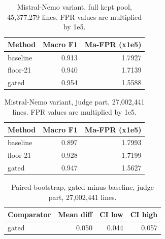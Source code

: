 \begin{table}[htbp]
\centering
\small
\begin{tabular}{lrr}
\toprule
\textbf{Method} & \textbf{Macro F1} & \textbf{Ma-FPR (x1e5)} \\
\midrule
baseline & 0.913 & 1.7927 \\
floor-21 & 0.940 & 1.7139 \\
gated & 0.954 & 1.5588 \\
\bottomrule
\end{tabular}
\caption{Mistral-Nemo variant, full kept pool, 45,377,279 lines. FPR values are multiplied by 1e5.}
\label{tab:mistralnemo_eval_fullpool}
\end{table}

\begin{table}[htbp]
\centering
\small
\begin{tabular}{lrr}
\toprule
\textbf{Method} & \textbf{Macro F1} & \textbf{Ma-FPR (x1e5)} \\
\midrule
baseline & 0.897 & 1.7993 \\
floor-21 & 0.928 & 1.7199 \\
gated & 0.947 & 1.5627 \\
\bottomrule
\end{tabular}
\caption{Mistral-Nemo variant, judge part, 27,002,441 lines. FPR values are multiplied by 1e5.}
\label{tab:mistralnemo_eval_judge}
\end{table}

\begin{table}[htbp]
\centering
\small
\begin{tabular}{lrrr}
\toprule
\textbf{Comparator} & \textbf{Mean diff} & \textbf{CI low} & \textbf{CI high} \\
\midrule
gated & 0.050 & 0.044 & 0.057 \\
\bottomrule
\end{tabular}
\caption{Paired bootstrap, gated minus baseline, judge part, 27,002,441 lines.}
\label{tab:mistralnemo_eval_bootstrap}
\end{table}
